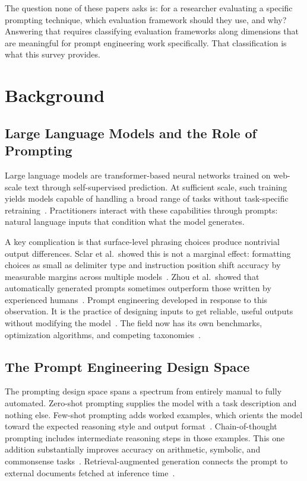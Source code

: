 \documentclass[journal]{IEEEtran}
\begin{document}
The question none of these papers asks is: for a researcher evaluating
a specific prompting technique, which evaluation framework should they
use, and why? Answering that requires classifying evaluation frameworks
along dimensions that are meaningful for prompt engineering work
specifically. That classification is what this survey provides.

\section{Background}
\label{sec:background}

\subsection{Large Language Models and the Role of Prompting}

Large language models are transformer-based neural networks trained on
web-scale text through self-supervised prediction. At sufficient scale,
such training yields models capable of handling a broad range of tasks
without task-specific retraining~\cite{brown2020gpt3, liu2021pretrain}. Practitioners interact
with these capabilities through prompts: natural language inputs that condition what the
model generates.

A key complication is that surface-level phrasing choices produce
nontrivial output differences. Sclar et al.\ showed this
is not a marginal effect: formatting choices as small as delimiter type and
instruction position shift accuracy by measurable margins across multiple
models~\cite{sclar2023formatting}. Zhou et al.\ showed that automatically
generated prompts sometimes outperform those written by experienced
humans~\cite{zhou2022ape}. Prompt engineering developed in response to
this observation. It is the practice of designing inputs to get reliable, useful
outputs without modifying the model~\cite{sahoo2024systematic}. The field
now has its own benchmarks, optimization algorithms, and competing
taxonomies~\cite{schulhoff2024prompt}.

\subsection{The Prompt Engineering Design Space}

The prompting design space spans a spectrum from entirely manual to fully
automated. Zero-shot prompting supplies the model with a task description
and nothing else. Few-shot
prompting adds worked examples, which orients the model toward the expected
reasoning style and output format~\cite{brown2020gpt3}. Chain-of-thought
prompting includes intermediate reasoning steps in those examples.
This one addition substantially improves accuracy on arithmetic, symbolic, and
commonsense tasks~\cite{wei2022chain}. Retrieval-augmented generation
connects the prompt to external documents fetched at inference
time~\cite{lewis2020retrieval, ragsurvey2023}.
\end{document}
